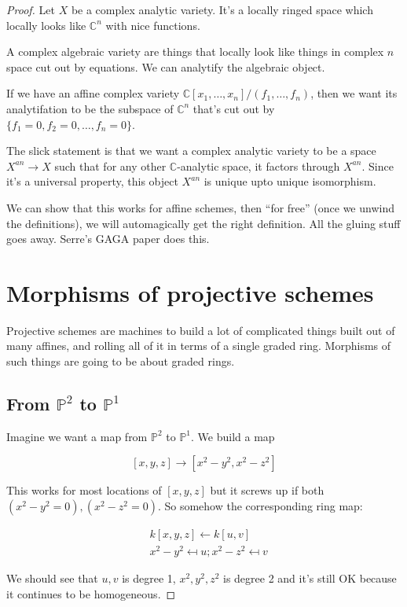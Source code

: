 \documentclass{book}
\newcommand{\C}{\ensuremath{\mathbb{C}}}
\renewcommand{\P}{\ensuremath{\mathbb{P}}}
\theoremstyle{definition}
\begin{document}
\begin{proof}
Let $X$ be a complex analytic variety. It's a locally ringed space which locally
looks like $\C^n$ with nice functions.

A complex algebraic variety are things that locally look like things in complex
$n$ space cut out by equations. We can analytify the algebraic object.

If we have an affine complex variety $\C[x_1, \dots, x_n] / (f_1, \dots, f_n)$, 
then we want its analytifation to be the subspace of $\C^n$ that's cut out by 
$\{ f_1 = 0, f_2 = 0, \dots, f_n = 0 \}$.


The slick statement is that we want a complex analytic variety to be a space
$X^{an} \rightarrow X$ such that for any other $\C$-analytic space, it factors
through $X^{an}$. Since it's a universal property, this object $X^{an}$ is unique
upto unique isomorphism.

We can show that this works for affine schemes, then ``for free'' (once we unwind
the definitions), we will automagically get the right definition. All the gluing
stuff goes away. Serre's GAGA paper does this.


\section{Morphisms of projective schemes}


Projective schemes are machines to build a lot of complicated things built
out of many affines, and rolling all of it in terms of a single graded ring.
Morphisms of such things are going to be about graded rings.

\subsection{From $\P^2$ to $\P^1$}
Imagine we want a map from $\P^2$ to $\P^1$. We build a map

$$
[x, y, z] \rightarrow [x^2 - y^2, x^2 - z^2]
$$

This works for most locations of $[x, y, z]$ but it screws up if  both
$(x^2 - y^2 = 0), (x^2 - z^2 = 0)$. So somehow the corresponding
ring map:

\begin{align*}
&k[x, y, z] \leftarrow k[u, v] \\
&x^2 - y^2 \mapsfrom u; x^2 - z^2 \mapsfrom v
\end{align*}

We should see that $u, v$ is degree 1, $x^2, y^2, z^2$ is degree 2 and it's
still OK because it continues to be homogeneous.



\end{proof}
\end{document}
